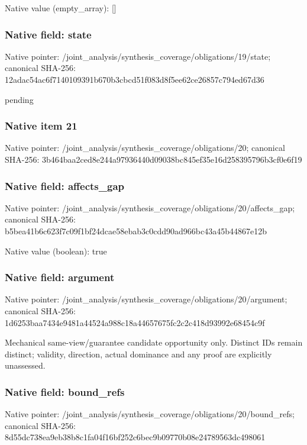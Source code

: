\documentclass[10pt,a4paper]{article}
\begin{document}
Native value (empty\_\allowbreak{}array): []

\subsubsection{Native field: state}
Native pointer: /joint\_\allowbreak{}analysis/synthesis\_\allowbreak{}coverage/obligations/19/state; canonical SHA-256: 12adac54ac6f7140109391b670b3cbcd51f083d8f5ee62ce26857c794ed67d36

\begingroup\raggedright\sloppy pending\par\endgroup

\subsubsection{Native item 21}
Native pointer: /joint\_\allowbreak{}analysis/synthesis\_\allowbreak{}coverage/obligations/20; canonical SHA-256: 3b464baa2ced8e244a97936440d09038bc845ef35e16d258395796b3cf0e6f19

\subsubsection{Native field: affects\_\allowbreak{}gap}
Native pointer: /joint\_\allowbreak{}analysis/synthesis\_\allowbreak{}coverage/obligations/20/affects\_\allowbreak{}gap; canonical SHA-256: b5bea41b6c623f7c09f1bf24dcae58ebab3c0cdd90ad966bc43a45b44867e12b

Native value (boolean): true

\subsubsection{Native field: argument}
Native pointer: /joint\_\allowbreak{}analysis/synthesis\_\allowbreak{}coverage/obligations/20/argument; canonical SHA-256: 1d6253baa7434e9481a44524a988c18a44657675fc2c2c418d93992e68454c9f

\begingroup\raggedright\sloppy Mechanical same-view/\allowbreak{}guarantee candidate opportunity only. Distinct IDs remain distinct;\allowbreak{} validity,\allowbreak{} direction,\allowbreak{} actual dominance and any proof are explicitly unassessed.\par\endgroup

\subsubsection{Native field: bound\_\allowbreak{}refs}
Native pointer: /joint\_\allowbreak{}analysis/synthesis\_\allowbreak{}coverage/obligations/20/bound\_\allowbreak{}refs; canonical SHA-256: 8d55dc738ea9eb38b8c1fa04f16bf252c6bec9b09770b08e24789563dc498061
\end{document}
